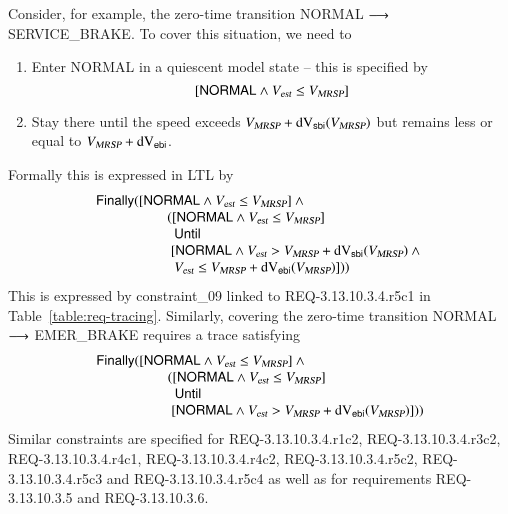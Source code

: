 



Consider, for example, the zero-time transition
{\sf NORMAL} $\longrightarrow$ {\sf SERVICE\_BRAKE}. To cover this situation, we need to 
\begin{enumerate}
\item Enter   {\sf NORMAL} in a quiescent model state -- this is specified by 
$$[\mathsf{NORMAL} \wedge {V_{\text{\sl est}}} \le {V_{\text{\sl MRSP}}}]$$
\item Stay there until the speed exceeds ${V_{\text{\sl MRSP}}} + \text{dV}_{\mathsf{sbi}}({V_{\text{\sl MRSP}}})$ but remains less or equal to ${V_{\text{\sl MRSP}}}+\text{dV}_{\mathsf{ebi}}$.
\end{enumerate}
Formally this is expressed in LTL by 
\[
\begin{array}{l}
 \mathsf{Finally} ([\mathsf{NORMAL}\wedge \vest \le \vmax]  \wedge {}
 \\\tabf
 ([\mathsf{NORMAL}\wedge \vest \le \vmax]
 \\\tabf \ \
 \mathsf{Until}
 \\\tabf\
 [\mathsf{NORMAL}\wedge \vest > \vmax+\dvs(\vmax) \wedge {}
 \\\tabf \  \
 \vest \le \vmax+\dve(\vmax)]))
\end{array}
\]
This is expressed by constraint\_09 linked to REQ-3.13.10.3.4.r5c1 in Table~\ref{table:req-tracing}.
Similarly, covering the zero-time transition {\sf NORMAL} $\longrightarrow$ {\sf EMER\_BRAKE} requires a trace satisfying
\[
\begin{array}{l}
 \mathsf{Finally} ([\mathsf{NORMAL}\wedge \vest \le \vmax]  \wedge {}
 \\\tabf
 ([\mathsf{NORMAL}\wedge \vest \le \vmax]
 \\\tabf \ \
 \mathsf{Until}
 \\\tabf\
 [\mathsf{NORMAL}\wedge \vest > \vmax+\dve(\vmax)]))
\end{array}
\]
Similar constraints are specified for 
REQ-3.13.10.3.4.r1c2,
REQ-3.13.10.3.4.r3c2,
REQ-3.13.10.3.4.r4c1,
REQ-3.13.10.3.4.r4c2,
REQ-3.13.10.3.4.r5c2,
REQ-3.13.10.3.4.r5c3 and 
REQ-3.13.10.3.4.r5c4
as well as for requirements REQ-3.13.10.3.5 and REQ-3.13.10.3.6.


